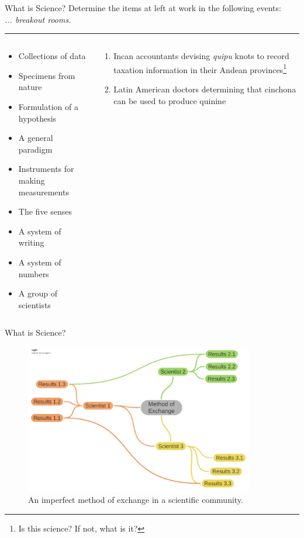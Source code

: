 \documentclass{beamer}
\begin{document}
\begin{frame}{What is Science?}
\small
Determine the items at left at work in the following events: \\ \textit{... breakout rooms.}
\rule{10cm}{0.05cm}
\begin{columns}
\begin{column}{0.65\textwidth}
\begin{itemize}
\item Collections of data
\item Specimens from nature
\item Formulation of a hypothesis
\item A general paradigm
\item Instruments for making measurements
\item The five senses
\item A system of writing
\item A system of numbers
\item A group of scientists
\end{itemize}
\end{column}
\begin{column}{0.35\textwidth}
\begin{enumerate}
\item Incan accountants devising \textit{quipu} knots to record taxation information in their Andean provinces\footnote{Is this science?  If not, what is it?}
\item Latin American doctors determining that cinchona can be used to produce quinine
\end{enumerate}
\end{column}
\end{columns}
\end{frame}

\begin{frame}{What is Science?}
\begin{figure}
\centering
\includegraphics[width=10cm]{figures/ScientificExchange.pdf}
\caption{An imperfect method of exchange in a scientific community.}
\end{figure}
\end{frame}
\end{document}
